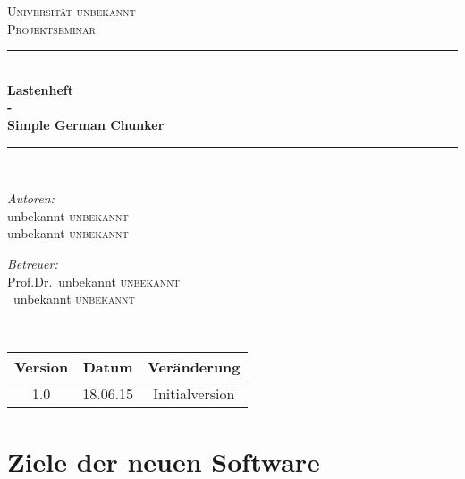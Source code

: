 \documentclass[10pt,a4paper]{article}
\begin{document}
\begin{titlepage}

\begin{center}

\textsc{\LARGE Universität unbekannt}\\[1.5cm]

\textsc{\Large Projektseminar}\\[0.5cm]

\newcommand{\HRule}{\rule{\linewidth}{0.5mm}}
\HRule \\[0.4cm]
{ \huge \bfseries Lastenheft\\ 
  \huge \bfseries -\\ 
  \huge \bfseries Simple German Chunker}\\[0.4cm]

\HRule \\[1.5cm]

\begin{minipage}{0.4\textwidth}
\begin{flushleft} \large
\emph{Autoren:}\\
unbekannt \textsc{unbekannt}\\
unbekannt \textsc{unbekannt}
\end{flushleft}
\end{minipage}
\hfill
\begin{minipage}{0.4\textwidth}
\begin{flushright} \large
\emph{Betreuer:} \\
Prof.Dr.~unbekannt \textsc{unbekannt}\\
~unbekannt \textsc{unbekannt}
\end{flushright}
\end{minipage}
\\[4.0cm]
\begin{tabular}{|c|c|c|}
\hline 
\textbf{Version} & \textbf{Datum} & \textbf{Veränderung} \\ 
\hline 
1.0 & 18.06.15 & Initialversion\\ 
\hline 
\end{tabular} 
\vfill

\end{center}

\end{titlepage}

\tableofcontents


\newpage 
\section{Ziele der neuen Software}
\end{document}
